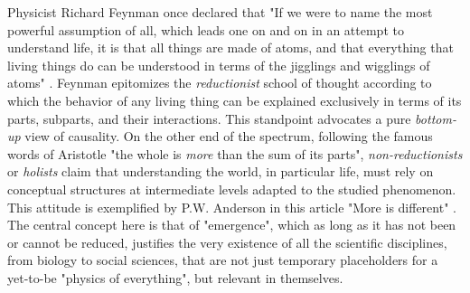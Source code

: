   Physicist Richard Feynman once declared that "If we were to name the most powerful assumption of all, which leads one on and on in an attempt to understand life, it is that all things are made of atoms, and that everything that living things do can be understood in terms of the jigglings and wigglings of atoms" \cite{Feynman:1964tu}. Feynman epitomizes the \textit{reductionist} school of thought according to which the behavior of any living thing can be explained exclusively in terms of its parts, subparts, and their interactions. This standpoint advocates a pure \textit{bottom-up} view of causality. On the other end of the spectrum, following the famous words of Aristotle "the whole is \textit{more} than the sum of its parts", \textit{non-reductionists} or \textit{holists} claim that understanding the world, in particular life, must rely on conceptual structures at intermediate levels adapted to the studied phenomenon. This attitude is exemplified by P.W. Anderson in this article "More is different" \cite{Anderson:1972wi}. The central concept here is that of "emergence", which as long as it has not been or cannot be reduced, justifies the very existence of all the scientific disciplines, from biology to social sciences, that are not just temporary placeholders for a yet-to-be "physics of everything", but relevant in themselves. 

